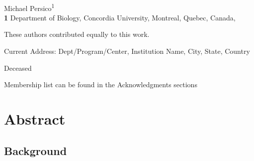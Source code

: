 \documentclass[
  10pt,
  letterpaper,
]{article}
\begin{document}
\vspace*{0.2in}

\begin{flushleft}
{\Large
\textbf{} %
}
\newline
\\
Michael Persico\textsuperscript{1}
\\
\bigskip
\textbf{1} Department of Biology, Concordia
University, Montreal, Quebec, Canada, 
\bigskip

% 
%
\Yinyang These authors contributed equally to this work.


\textcurrency Current Address: Dept/Program/Center, Institution Name, City, State, Country %

\dag Deceased

\textpilcrow Membership list can be found in the Acknowledgments
sections


\end{flushleft}

\section*{Abstract}
\hypertarget{background}{%
\subsection{Background}\label{background}}
\end{document}
